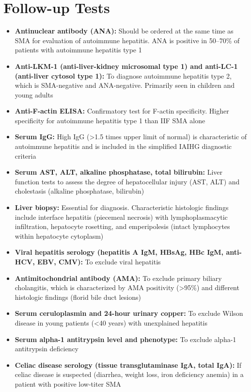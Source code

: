 \section*{Follow-up Tests}
\begin{itemize}
  \item \textbf{Antinuclear antibody (ANA):} Should be ordered at the same time as SMA for evaluation of autoimmune hepatitis. ANA is positive in 50--70\% of patients with autoimmune hepatitis type 1
  \item \textbf{Anti-LKM-1 (anti-liver-kidney microsomal type 1) and anti-LC-1 (anti-liver cytosol type 1):} To diagnose autoimmune hepatitis type 2, which is SMA-negative and ANA-negative. Primarily seen in children and young adults
  \item \textbf{Anti-F-actin ELISA:} Confirmatory test for F-actin specificity. Higher specificity for autoimmune hepatitis type 1 than IIF SMA alone
  \item \textbf{Serum IgG:} High IgG (>1.5 times upper limit of normal) is characteristic of autoimmune hepatitis and is included in the simplified IAIHG diagnostic criteria
  \item \textbf{Serum AST, ALT, alkaline phosphatase, total bilirubin:} Liver function tests to assess the degree of hepatocellular injury (AST, ALT) and cholestasis (alkaline phosphatase, bilirubin)
  \item \textbf{Liver biopsy:} Essential for diagnosis. Characteristic histologic findings include interface hepatitis (piecemeal necrosis) with lymphoplasmacytic infiltration, hepatocyte rosetting, and emperipolesis (intact lymphocytes within hepatocyte cytoplasm)
  \item \textbf{Viral hepatitis serology (hepatitis A IgM, HBsAg, HBc IgM, anti-HCV, EBV, CMV):} To exclude viral hepatitis
  \item \textbf{Antimitochondrial antibody (AMA):} To exclude primary biliary cholangitis, which is characterized by AMA positivity (>95\%) and different histologic findings (florid bile duct lesions)
  \item \textbf{Serum ceruloplasmin and 24-hour urinary copper:} To exclude Wilson disease in young patients (<40 years) with unexplained hepatitis
  \item \textbf{Serum alpha-1 antitrypsin level and phenotype:} To exclude alpha-1 antitrypsin deficiency
  \item \textbf{Celiac disease serology (tissue transglutaminase IgA, total IgA):} If celiac disease is suspected (diarrhea, weight loss, iron deficiency anemia) in a patient with positive low-titer SMA
\end{itemize}

